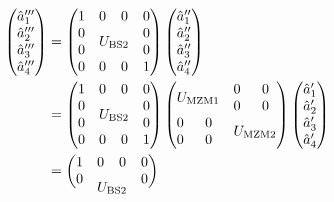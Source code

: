 \begin{equation}
	\begin{split}
		\begin{pmatrix}
			\hat{a}_1^{\prime\prime\prime} \\
			\hat{a}_2^{\prime\prime\prime} \\
			\hat{a}_3^{\prime\prime\prime} \\
			\hat{a}_4^{\prime\prime\prime}
		\end{pmatrix}
		&=
		\begin{pmatrix}
			 1 & 0 & 0 & 0 \\
			 0 & \multicolumn{2}{c}{\multirow{2}{*}{$U_\text{BS2}$}} & 0 \\
			 0 & & & 0 \\
			 0 & 0 & 0 & 1
		\end{pmatrix}
		\begin{pmatrix}
			\hat{a}_1^{\prime\prime} \\
			\hat{a}_2^{\prime\prime} \\
			\hat{a}_3^{\prime\prime} \\
			\hat{a}_4^{\prime\prime}
		\end{pmatrix}
		\\
		&=
		\begin{pmatrix}
			 1 & 0 & 0 & 0 \\
			 0 & \multicolumn{2}{c}{\multirow{2}{*}{$U_\text{BS2}$}} & 0 \\
			 0 & & & 0 \\
			 0 & 0 & 0 & 1
		\end{pmatrix}
		\begin{pmatrix}
			 \multicolumn{2}{c}{\multirow{2}{*}{$U_\text{MZM1}$}} & 0 & 0 \\
			 & & 0 & 0 \\
			 0 & 0 & \multicolumn{2}{c}{\multirow{2}{*}{$U_\text{MZM2}$}} \\
			 0 & 0 & & \\
		\end{pmatrix}
		\begin{pmatrix}
			\hat{a}_1^\prime \\
			\hat{a}_2^\prime \\
			\hat{a}_3^\prime \\
			\hat{a}_4^\prime
		\end{pmatrix}
		\\
		&=
		\begin{pmatrix}
			 1 & 0 & 0 & 0 \\
			 0 & \multicolumn{2}{c}{\multirow{2}{*}{$U_\text{BS2}$}} & 0 \\

\end{pmatrix}
\end{split}
\end{equation}
